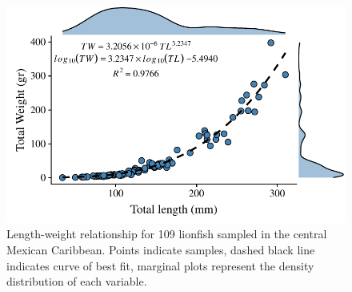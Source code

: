 \documentclass[fleqn,10pt,lineno]{wlpeerj} %
\begin{document}
\begin{figure}
\centering
\includegraphics{Manuscript_files/figure-latex/unnamed-chunk-4-1.pdf}
\caption{\label{fig:l-w-carib}Length-weight relationship for 109
lionfish sampled in the central Mexican Caribbean. Points indicate
samples, dashed black line indicates curve of best fit, marginal plots
represent the density distribution of each variable.}
\end{figure}
\end{document}
